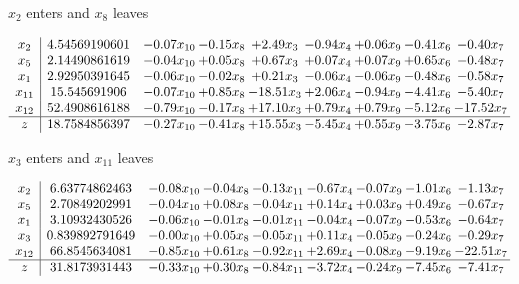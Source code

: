 \documentclass[9pt]{article}
\begin{document}
 $ x_{2} $ enters and $ x_{8} $ leaves 

 \[\begin{array}{c| c c@{\hskip 2pt} c@{\hskip 2pt} c@{\hskip 2pt} c@{\hskip 2pt} c@{\hskip 2pt} c@{\hskip 2pt} c@{\hskip 2pt} }
 x_{2}   &  4.54569190601 & -0.07 x_{10} & -0.15 x_{8} & +  2.49 x_{3} & -0.94 x_{4} & +  0.06 x_{9} & -0.41 x_{6} & -0.40 x_{7}\\
 x_{5}   &  2.14490861619 & -0.04 x_{10} & +  0.05 x_{8} & +  0.67 x_{3} & +  0.07 x_{4} & +  0.07 x_{9} & +  0.65 x_{6} & -0.48 x_{7}\\
 x_{1}   &  2.92950391645 & -0.06 x_{10} & -0.02 x_{8} & +  0.21 x_{3} & -0.06 x_{4} & -0.06 x_{9} & -0.48 x_{6} & -0.58 x_{7}\\
 x_{11}   &  15.545691906 & -0.07 x_{10} & +  0.85 x_{8} & -18.51 x_{3} & +  2.06 x_{4} & -0.94 x_{9} & -4.41 x_{6} & -5.40 x_{7}\\
 x_{12}   &  52.4908616188 & -0.79 x_{10} & -0.17 x_{8} & + 17.10 x_{3} & +  0.79 x_{4} & +  0.79 x_{9} & -5.12 x_{6} & -17.52 x_{7}\\
\hline
z    &  18.7584856397 & -0.27 x_{10} & -0.41 x_{8} & + 15.55 x_{3} & -5.45 x_{4} & +  0.55 x_{9} & -3.75 x_{6} & -2.87 x_{7}\\
\end{array}\]


 $ x_{3} $ enters and $ x_{11} $ leaves 

 \[\begin{array}{c| c c@{\hskip 2pt} c@{\hskip 2pt} c@{\hskip 2pt} c@{\hskip 2pt} c@{\hskip 2pt} c@{\hskip 2pt} c@{\hskip 2pt} }
 x_{2}   &  6.63774862463 & -0.08 x_{10} & -0.04 x_{8} & -0.13 x_{11} & -0.67 x_{4} & -0.07 x_{9} & -1.01 x_{6} & -1.13 x_{7}\\
 x_{5}   &  2.70849202991 & -0.04 x_{10} & +  0.08 x_{8} & -0.04 x_{11} & +  0.14 x_{4} & +  0.03 x_{9} & +  0.49 x_{6} & -0.67 x_{7}\\
 x_{1}   &  3.10932430526 & -0.06 x_{10} & -0.01 x_{8} & -0.01 x_{11} & -0.04 x_{4} & -0.07 x_{9} & -0.53 x_{6} & -0.64 x_{7}\\
 x_{3}   &  0.839892791649 & -0.00 x_{10} & +  0.05 x_{8} & -0.05 x_{11} & +  0.11 x_{4} & -0.05 x_{9} & -0.24 x_{6} & -0.29 x_{7}\\
 x_{12}   &  66.8545634081 & -0.85 x_{10} & +  0.61 x_{8} & -0.92 x_{11} & +  2.69 x_{4} & -0.08 x_{9} & -9.19 x_{6} & -22.51 x_{7}\\
\hline
z    &  31.8173931443 & -0.33 x_{10} & +  0.30 x_{8} & -0.84 x_{11} & -3.72 x_{4} & -0.24 x_{9} & -7.45 x_{6} & -7.41 x_{7}\\
\end{array}\]
\end{document}
